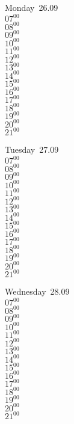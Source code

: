 \documentclass[11pt,a4paper]{book}\usepackage[]{graphicx}\usepackage[]{color}
\begin{document}
\begin{headerbox}
\end{headerbox}
\begin{weekdaybox}
  Monday~26.09\\
  { 
  \vfill
  $07^{00}$\\
$08^{00}$\\
$09^{00}$\\
$10^{00}$\\
$11^{00}$\\
$12^{00}$\\
$13^{00}$\\
$14^{00}$\\
$15^{00}$\\
$16^{00}$\\
$17^{00}$\\
$18^{00}$\\
$19^{00}$\\
$20^{00}$\\
$21^{00}$\\
  }
\end{weekdaybox}
\begin{weekdaybox}
  Tuesday~27.09\\
  { 
  \vfill
  $07^{00}$\\
$08^{00}$\\
$09^{00}$\\
$10^{00}$\\
$11^{00}$\\
$12^{00}$\\
$13^{00}$\\
$14^{00}$\\
$15^{00}$\\
$16^{00}$\\
$17^{00}$\\
$18^{00}$\\
$19^{00}$\\
$20^{00}$\\
$21^{00}$\\
  }
\end{weekdaybox}
\begin{weekdaybox}
  Wednesday~28.09\\
  { 
  \vfill
  $07^{00}$\\
$08^{00}$\\
$09^{00}$\\
$10^{00}$\\
$11^{00}$\\
$12^{00}$\\
$13^{00}$\\
$14^{00}$\\
$15^{00}$\\
$16^{00}$\\
$17^{00}$\\
$18^{00}$\\
$19^{00}$\\
$20^{00}$\\
$21^{00}$\\
  }
\end{weekdaybox}
\end{document}
